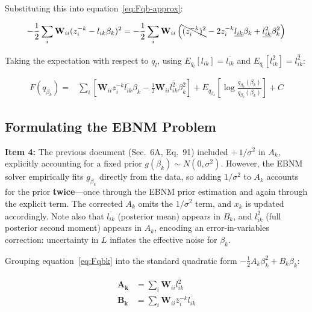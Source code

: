\documentclass{article}[12pt]
\begin{document}
Substituting this into equation~\ref{eq:Fqb-approx}:

\begin{equation}
    -\frac{1}{2}\sum_i \mathbf{W}_{ii}(z_i^{-k} - l_{ik}\beta_k)^2 = -\frac{1}{2}\sum_i \mathbf{W}_{ii} \left( \bcancel{(z_i^{-k})^2} - 2z_i^{-k}\underline{l_{ik}}\beta_k + \underline{l_{ik}^2}\beta_k^2 \right)
\end{equation}

Taking the expectation with respect to $q_l$, using $E_{q_l}[l_{ik}] = \overline{l_{ik}}$ and $E_{q_l}[l_{ik}^2] = \overline{l_{ik}^2}$:

\begin{equation}
\begin{aligned}
    F(q_{\beta_k}) = {} & \sum_i \left[ \mathbf{W}_{ii} z_i^{-k} \overline{l_{ik}} \beta_k - \frac{1}{2} \mathbf{W}_{ii} \overline{l_{ik}^2} \beta_k^2 \right]
    + E_{q_{\beta_k}} \left[ \log \frac{g_{\beta_k}(\beta_k)}{q_{\beta_k}(\beta_k)} \right] + C
\end{aligned}\label{eq:Fqbk}
\end{equation}

\subsection{Formulating the EBNM Problem}

\begin{corrbox}
\textbf{Item 4:} The previous document (Sec.~6A, Eq.~91) included $+\,1/\sigma^2$
in $A_k$, explicitly accounting for a fixed prior $g(\beta_k)\sim N(0,\sigma^2)$.
However, the EBNM solver empirically fits $g_{\beta_k}$ directly from the data,
so adding $1/\sigma^2$ to $A_k$ accounts for the prior \textbf{twice}---once
through the EBNM prior estimation and again through the explicit term. The
corrected $A_k$ omits the $1/\sigma^2$ term, and $x_k$ is updated accordingly.
Note also that $\overline{l_{ik}}$ (posterior mean) appears in $B_k$, and
$\overline{l_{ik}^2}$ (full posterior second moment) appears in $A_k$, encoding
an error-in-variables correction: uncertainty in $L$ inflates the effective
noise for $\beta_k$.
\end{corrbox}

\medskip
Grouping equation~\ref{eq:Fqbk} into the standard quadratic form $-\frac{1}{2}A_k\beta_k^2 + B_k\beta_k$:

\begin{align}
    \mathbf{A_k} &= \sum_i \mathbf{W}_{ii} \overline{l_{ik}^2}\label{eq:A-beta}\\
    \mathbf{B_k} &= \sum_i \mathbf{W}_{ii} \overline{z}^{-k}_{i} \overline{l_{ik}}\label{eq:B-beta}
\end{align}
\end{document}
